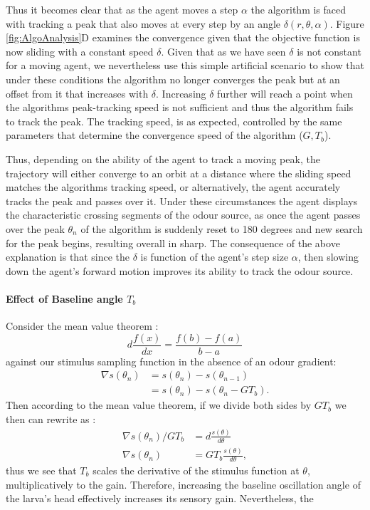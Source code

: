 Thus it becomes clear that as the agent moves a step $\alpha$ the algorithm is faced with tracking a peak that also moves at every step by an angle $\delta(r,\theta,\alpha)$.
Figure \ref{fig:AlgoAnalysis}D examines the convergence given that the objective function is now sliding with a constant speed $\delta$. Given that as we have seen $\delta$ is not constant for a moving agent,  we nevertheless use this simple artificial scenario to show that under these conditions the algorithm no longer converges the peak  but at an offset from it that increases with $\delta$.
 Increasing $\delta$ further will reach a point when the algorithms peak-tracking speed is not sufficient and thus the algorithm fails to track the peak. The tracking speed, is as expected, controlled by the same parameters that determine the convergence speed of the algorithm ($G, T_b$). 
 
Thus, depending on the ability of the agent to track a moving peak, the trajectory will either converge to an orbit at a distance where the sliding speed matches the algorithms tracking speed, or alternatively, the agent  accurately tracks the peak and passes over it.
 Under these circumstances the agent displays the characteristic crossing segments of the odour source, as once the agent passes over the peak  $\theta_n$ of the algorithm is suddenly reset to 180 degrees and new search for the peak begins, resulting overall in sharp.
The consequence of the above explanation is that since the $\delta$ is function of the agent's step size $\alpha$, then slowing down the agent's forward motion improves its ability to track the odour source. 


\paragraph{Effect of Baseline angle $T_b$}
Consider the mean value theorem :
\begin{equation}
d\frac{f(x)}{dx} = \frac{f(b) - f(a)}{b-a}
\end{equation}
against our stimulus sampling function in the absence of an odour gradient:
\begin{align}
\nabla s(\theta_n) &= s(\theta_n) - s(\theta_{n-1})\nonumber \\
				   &= s(\theta_n) - s(\theta_{n} - G T_b).
\end{align}
Then according to the mean value theorem, if we divide both sides by $G T_b$ we then can rewrite as :
\begin{align}
\nabla s(\theta_n)/G T_b &= d\frac{s(\theta)}{d\theta} \nonumber \\
       \nabla s(\theta_n) &= G T_b \frac{s(\theta)}{d\theta},
\end{align}
thus we see that $T_b$ scales the derivative of the stimulus function at $\theta$, multiplicatively to the gain. Therefore, increasing the baseline oscillation angle of the larva's head effectively increases its sensory gain. Nevertheless, the  

